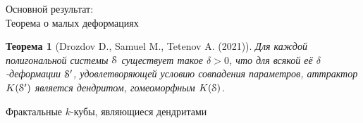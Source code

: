 \documentclass[aspectratio=1610, 10pt, notheorems]{beamer}
\newtheorem{theorem}     {Теорема}
\begin{document}




\begin{frame}{Основной результат:\\Теорема о малых деформациях}
\begin{theorem}[Drozdov D., Samuel M., Tetenov A. (2021)]
Для каждой полигональной системы ${\EuScript S}$ существует такое $\delta > 0$, что для всякой её $\delta$-деформации ${\EuScript S}'$, удовлетворяющей условию совпадения параметров, аттрактор $K({\EuScript S}')$ является дендритом, гомеоморфным $K({\EuScript S})$.
\end{theorem}
\end{frame}


\begin{frame}{}
\Huge{Фрактальные $k$-кубы, являющиеся дендритами}
\end{frame}

\end{document}
